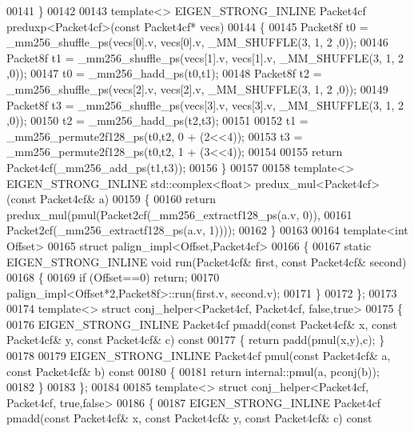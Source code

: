 \begin{DoxyCode}
00141 \}
00142 
00143 \textcolor{keyword}{template}<> EIGEN\_STRONG\_INLINE Packet4cf preduxp<Packet4cf>(\textcolor{keyword}{const} Packet4cf* vecs)
00144 \{
00145   Packet8f t0 = \_mm256\_shuffle\_ps(vecs[0].v, vecs[0].v, \_MM\_SHUFFLE(3, 1, 2 ,0));
00146   Packet8f t1 = \_mm256\_shuffle\_ps(vecs[1].v, vecs[1].v, \_MM\_SHUFFLE(3, 1, 2 ,0));
00147   t0 = \_mm256\_hadd\_ps(t0,t1);
00148   Packet8f t2 = \_mm256\_shuffle\_ps(vecs[2].v, vecs[2].v, \_MM\_SHUFFLE(3, 1, 2 ,0));
00149   Packet8f t3 = \_mm256\_shuffle\_ps(vecs[3].v, vecs[3].v, \_MM\_SHUFFLE(3, 1, 2 ,0));
00150   t2 = \_mm256\_hadd\_ps(t2,t3);
00151   
00152   t1 = \_mm256\_permute2f128\_ps(t0,t2, 0 + (2<<4));
00153   t3 = \_mm256\_permute2f128\_ps(t0,t2, 1 + (3<<4));
00154 
00155   \textcolor{keywordflow}{return} Packet4cf(\_mm256\_add\_ps(t1,t3));
00156 \}
00157 
00158 \textcolor{keyword}{template}<> EIGEN\_STRONG\_INLINE std::complex<float> predux\_mul<Packet4cf>(\textcolor{keyword}{const} Packet4cf& a)
00159 \{
00160   \textcolor{keywordflow}{return} predux\_mul(pmul(Packet2cf(\_mm256\_extractf128\_ps(a.v, 0)),
00161                          Packet2cf(\_mm256\_extractf128\_ps(a.v, 1))));
00162 \}
00163 
00164 \textcolor{keyword}{template}<\textcolor{keywordtype}{int} Offset>
00165 \textcolor{keyword}{struct }palign\_impl<Offset,Packet4cf>
00166 \{
00167   \textcolor{keyword}{static} EIGEN\_STRONG\_INLINE \textcolor{keywordtype}{void} run(Packet4cf& first, \textcolor{keyword}{const} Packet4cf& second)
00168   \{
00169     \textcolor{keywordflow}{if} (Offset==0) \textcolor{keywordflow}{return};
00170     palign\_impl<Offset*2,Packet8f>::run(first.v, second.v);
00171   \}
00172 \};
00173 
00174 \textcolor{keyword}{template}<> \textcolor{keyword}{struct }conj\_helper<Packet4cf, Packet4cf, false,true>
00175 \{
00176   EIGEN\_STRONG\_INLINE Packet4cf pmadd(\textcolor{keyword}{const} Packet4cf& x, \textcolor{keyword}{const} Packet4cf& y, \textcolor{keyword}{const} Packet4cf& c)\textcolor{keyword}{ const}
00177 \textcolor{keyword}{  }\{ \textcolor{keywordflow}{return} padd(pmul(x,y),c); \}
00178 
00179   EIGEN\_STRONG\_INLINE Packet4cf pmul(\textcolor{keyword}{const} Packet4cf& a, \textcolor{keyword}{const} Packet4cf& b)\textcolor{keyword}{ const}
00180 \textcolor{keyword}{  }\{
00181     \textcolor{keywordflow}{return} internal::pmul(a, pconj(b));
00182   \}
00183 \};
00184 
00185 \textcolor{keyword}{template}<> \textcolor{keyword}{struct }conj\_helper<Packet4cf, Packet4cf, true,false>
00186 \{
00187   EIGEN\_STRONG\_INLINE Packet4cf pmadd(\textcolor{keyword}{const} Packet4cf& x, \textcolor{keyword}{const} Packet4cf& y, \textcolor{keyword}{const} Packet4cf& c)\textcolor{keyword}{ const}

\end{DoxyCode}
